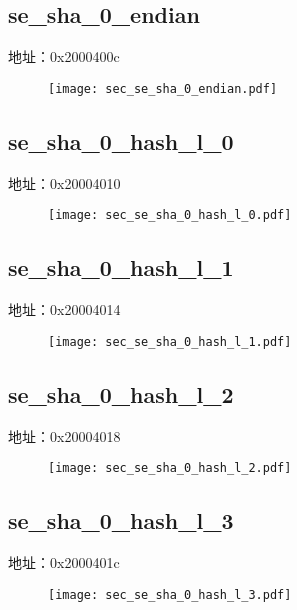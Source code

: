 \subsection{se\_sha\_0\_endian}
\label{sec-se-sha-0-endian}
地址：0x2000400c
 \begin{figure}[H]
\texttt{[image: sec\_se\_sha\_0\_endian.pdf]}
\end{figure}

\subsection{se\_sha\_0\_hash\_l\_0}
\label{sec-se-sha-0-hash-l-0}
地址：0x20004010
 \begin{figure}[H]
\texttt{[image: sec\_se\_sha\_0\_hash\_l\_0.pdf]}
\end{figure}

\subsection{se\_sha\_0\_hash\_l\_1}
\label{sec-se-sha-0-hash-l-1}
地址：0x20004014
 \begin{figure}[H]
\texttt{[image: sec\_se\_sha\_0\_hash\_l\_1.pdf]}
\end{figure}

\subsection{se\_sha\_0\_hash\_l\_2}
\label{sec-se-sha-0-hash-l-2}
地址：0x20004018
 \begin{figure}[H]
\texttt{[image: sec\_se\_sha\_0\_hash\_l\_2.pdf]}
\end{figure}

\subsection{se\_sha\_0\_hash\_l\_3}
\label{sec-se-sha-0-hash-l-3}
地址：0x2000401c
 \begin{figure}[H]
\texttt{[image: sec\_se\_sha\_0\_hash\_l\_3.pdf]}
\end{figure}

